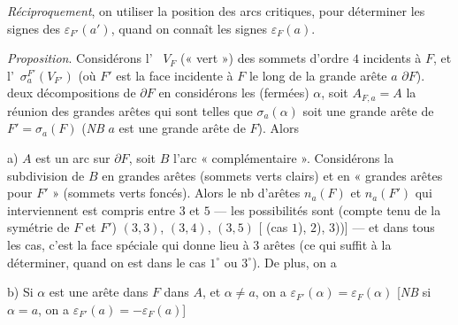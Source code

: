 \documentclass[11pt,a4paper]{article}
\begin{document}
\emph{Réciproquement}, on  utiliser la position des arcs critiques, pour déterminer les signes des \struck{\ill{}} $\varepsilon_{F'}(a')$, quand on connaît les signes \struck{\ill{}} $\varepsilon_F(a)$.

\emph{Proposition}. Considérons l'\ \struck{\ill{}} $V_F$ (« vert ») des sommets d'ordre $4$ \struck{\ill{}} incidents à $F$, et l'\ $\sigma_a^{F'}(V_{F'})$ (où $F'$ est la face incidente à $F$ le long de la grande arête $a$  $\partial F$).  \struck{\ill{}}  deux décompositions de $\partial F$ en \struck{\ill{}}  considérons les (fermées) $\alpha$, soit $A_{F,a} = A$ la réunion des grandes arêtes  qui sont telles que $\sigma_a(\alpha)$ soit une grande arête de $F' = \sigma_a(F)$ (\emph{NB} $a$ est une grande arête de $F$). Alors

a) $A$ est un arc sur $\partial F$, soit $B$ l'arc « complémentaire ».  Considérons la subdivision de $B$ en grandes arêtes (sommets verts clairs) et en « grandes arêtes pour $F'$ » (sommets verts foncés). Alors le nb d'arêtes $n_a(F)$ et $n_a(F')$ qui interviennent est \struck{\ill{}} compris entre $3$ et $5$ --- les possibilités sont (compte tenu de la symétrie de $F$ et $F'$) $(3, 3)$, $(3, 4)$, $(3, 5)$ [ (cas $1$), $2$), $3$))] --- et dans tous les cas, c'est la face spéciale qui donne lieu à $3$ arêtes (ce qui suffit à la déterminer, quand on est dans le cas $1^{\circ}$ ou $3^{\circ}$). De plus, on a

b) Si $\alpha$ est une  arête dans $F$ dans $A$, \struck{\ill{} \ill{}} et $\alpha \neq a$, on a $\varepsilon_{F'}(\alpha) = \varepsilon_{F}(\alpha)$ [\emph{NB} si $\alpha = a$, on a $\varepsilon_{F'}(a) = -\varepsilon_F(a)$]
\end{document}
